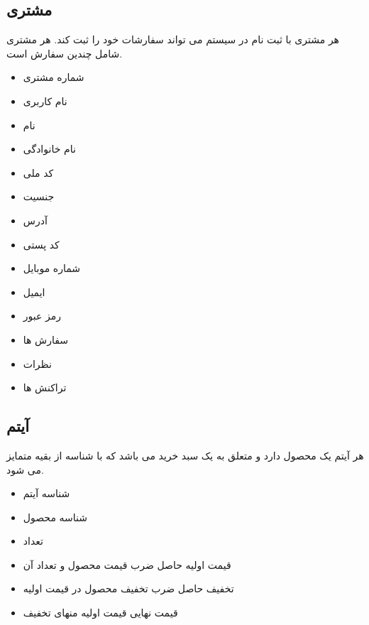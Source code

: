 \documentclass[]{article}
\begin{document}
\subsection{مشتری}
هر مشتری با ثبت نام در سیستم می تواند سفارشات خود را ثبت کند. هر مشتری شامل چندین سفارش است. 
\begin{itemize}
\item شماره مشتری
\item نام کاربری
\item نام
\item نام خانوادگی
\item کد ملی
\item جنسیت
\item آدرس
\item کد پستی
\item شماره موبایل
\item ایمیل
\item رمز عبور
\item سفارش ها
\item نظرات
\item تراکنش ها
\end{itemize}





\subsection{آیتم}
هر آیتم یک محصول دارد و متعلق به یک سبد خرید می باشد که با شناسه از بقیه متمایز می شود.

\begin{itemize}
\item شناسه آیتم
\item شناسه محصول
\item تعداد
\item قیمت اولیه \newline
حاصل ضرب قیمت محصول و تعداد آن
\item تخفیف \newline
حاصل ضرب تخفیف محصول در قیمت اولیه
\item قیمت نهایی \newline
قیمت اولیه منهای تخفیف
\end{itemize}
\end{document}
